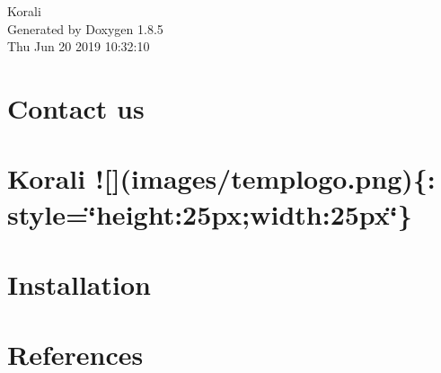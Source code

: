 \documentclass[twoside]{book}
\newcommand{\clearemptydoublepage}{%
  \newpage{\pagestyle{empty}\cleardoublepage}%
}
\begin{document}
\hypersetup{pageanchor=false}
\begin{titlepage}
\vspace*{7cm}
\begin{center}%
{\Large Korali }\\
\vspace*{1cm}
{\large Generated by Doxygen 1.8.5}\\
\vspace*{0.5cm}
{\small Thu Jun 20 2019 10:32:10}\\
\end{center}
\end{titlepage}
\clearemptydoublepage
\tableofcontents
\clearemptydoublepage
{}
\hypersetup{pageanchor=true}

\chapter{Contact us}
\label{md__home_martiser_skorali_doc_mkdocs_docs_aboutus}
\hypertarget{md__home_martiser_skorali_doc_mkdocs_docs_aboutus}{}

\chapter{Korali !\mbox{[}\mbox{]}(images/templogo.png)\{\-: style=\char`\"{}height\-:25px;width\-:25px\char`\"{}\}}
\label{md__home_martiser_skorali_doc_mkdocs_docs_index}
\hypertarget{md__home_martiser_skorali_doc_mkdocs_docs_index}{}

\chapter{Installation}
\label{md__home_martiser_skorali_doc_mkdocs_docs_installation}
\hypertarget{md__home_martiser_skorali_doc_mkdocs_docs_installation}{}

\chapter{References}
\label{md__home_martiser_skorali_doc_mkdocs_docs_references}
\hypertarget{md__home_martiser_skorali_doc_mkdocs_docs_references}{}


\newpage
{}
{}
\printindex
\end{document}
